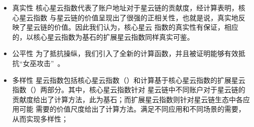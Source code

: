 \begin{itemize}
\item{真实性} 核心星云指数代表了账户地址对于星云链的贡献度，经计算表明，核心星云指数
与星云链的价值呈现出了很强的正相关性，也就是说，真实地反映了星云链的价值。因此我们认为，核心星云
指数的真实性有保证，相应的，以核心星云指数为基石的扩展星云指数同样真实可鉴。
\item{公平性} 为了抵抗操纵，我们引入了全新的计算函数，并且被证明能够有效抵抗“女巫攻击”~\cite{cheng2005sybilproof}。
\item{多样性} 星云指数包括核心星云指数（\nrcore）和计算基于核心星云指数的扩展星云指数（\nrext）两部分。其中，核心星云指数针对
星云链中不同账户对于星云链的贡献度给出了计算方法，此为基石；而扩展星云指数则针对星云链生态中各应用可能
需要的价值尺度给出了计算方法。满足不同应用和不同场景的需要，从而实现多样性；%
\end{itemize}

